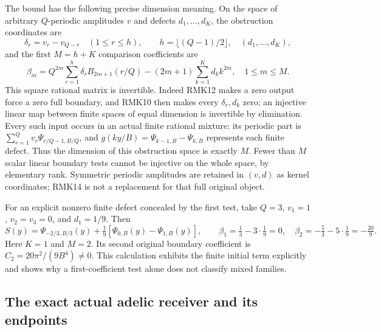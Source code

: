 The bound has the following precise dimension meaning. On the space
of arbitrary $Q$-periodic amplitudes $v$ and defects $d_1,\ldots,d_K$,
the obstruction coordinates are
\begin{equation}\tag{RMK14}
 \delta_r=v_r-v_{Q-r}\quad(1\leq r\leq h),\qquad
 h=\lfloor(Q-1)/2\rfloor,
 \quad(d_1,\ldots,d_K),
\end{equation}
and the first $M=h+K$ comparison coefficients are
\begin{equation}\tag{RMK15}
 \beta_m=Q^{2m}\sum_{r=1}^h
       \delta_r B_{2m+1}(r/Q)
       -(2m+1)\sum_{k=1}^K d_k k^{2m},
       \quad1\leq m\leq M.
\end{equation}
This square rational matrix is invertible. Indeed RMK12 makes a
zero output force a zero full boundary, and RMK10 then makes every
$\delta_r,d_k$ zero; an injective linear map between finite spaces
of equal dimension is invertible by elimination. Every such input
occurs in an actual finite rational mixture: its periodic part is
$\sum_{r=1}^Qv_r\Psi_{r/Q-1,B/Q}$, and
$g(ky/B)=\Psi_{k-1,B}-\Psi_{k,B}$ represents each finite defect.
Thus the dimension of this obstruction space is exactly $M$.
Fewer than $M$ scalar linear boundary tests cannot be injective on
the whole space, by elementary rank. Symmetric periodic amplitudes
are retained in $(v,d)$ as kernel coordinates; RMK14 is not a
replacement for that full original object.

For an explicit nonzero finite defect concealed by the first test,
take $Q=3$, $v_1=1$, $v_2=v_3=0$, and $d_1=1/9$. Then
\begin{equation}\tag{RMK16}
 S(y)=\Psi_{-2/3,B/3}(y)
             +\tfrac19[\Psi_{0,B}(y)-\Psi_{1,B}(y)],\qquad
 \beta_1=\tfrac13-3\cdot\tfrac19=0,\quad
 \beta_2=-\tfrac53-5\cdot\tfrac19=-\tfrac{20}{9}.
\end{equation}
Here $K=1$ and $M=2$. Its second original boundary coefficient is
$C_2=20\pi^2/(9B^4)\ne0$. This calculation exhibits the finite
initial term explicitly and shows why a first-coefficient test alone
does not classify mixed families.

\subsection{The exact actual adelic receiver and its endpoints}

